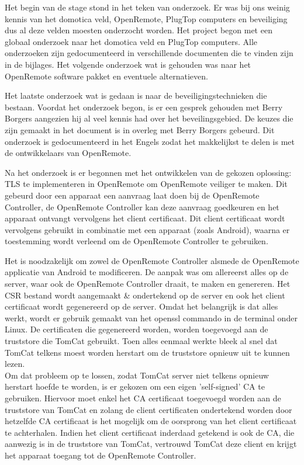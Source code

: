 \documentclass[]{article}
\begin{document}
Het begin van de stage stond in het teken van onderzoek. Er was bij ons
weinig kennis van het domotica veld, OpenRemote, PlugTop computers en
beveiliging dus al deze velden moesten onderzocht worden. Het project begon
met een globaal onderzoek naar het domotica veld en PlugTop computers. Alle
onderzoeken zijn gedocumenteerd in verschillende documenten die te vinden
zijn in de bijlages. Het volgende onderzoek wat is gehouden was naar het
OpenRemote software pakket en eventuele alternatieven.

Het laatste onderzoek wat is gedaan is naar de beveiligingstechnieken die
bestaan. Voordat het onderzoek begon, is er een gesprek gehouden met Berry
Borgers aangezien hij al veel kennis had over het beveilingsgebied. De
keuzes die zijn gemaakt in het document is in overleg met Berry Borgers
gebeurd. Dit onderzoek is gedocumenteerd in het Engels zodat het
makkelijkst te delen is met de ontwikkelaars van OpenRemote.

Na het onderzoek is er begonnen met het ontwikkelen van de gekozen
oplossing: TLS te implementeren in OpenRemote om OpenRemote veiliger te
maken. Dit gebeurd door een apparaat een aanvraag laat doen bij de
OpenRemote Controller, de OpenRemote Controller kan deze aanvraag
goedkeuren en het apparaat ontvangt vervolgens het client certificaat. Dit
client certificaat wordt vervolgens gebruikt in combinatie met een apparaat (zoals
Android), waarna er toestemming wordt verleend om de OpenRemote Controller te gebruiken.

Het is noodzakelijk om zowel de OpenRemote Controller alsmede de OpenRemote applicatie 
van Android te modificeren. De aanpak was om allereerst alles op de server, waar ook de 
OpenRemote Controller draait, te maken en genereren. Het CSR bestand wordt
aangemaakt \& ondertekend op de server en ook het
client certificaat wordt gegenereerd op de server. Omdat het belangrijk is
dat alles werkt, wordt er gebruik gemaakt van het openssl commando in de
terminal onder Linux. De certificaten die gegenereerd worden, worden
toegevoegd aan de truststore die TomCat gebruikt. Toen alles eenmaal
werkte bleek al snel dat TomCat telkens moest worden herstart om de
truststore opnieuw uit te kunnen lezen.\\
Om dat probleem op te lossen, zodat TomCat server niet telkens opnieuw
herstart hoefde te worden, is er gekozen om een eigen 'self-signed' CA te
gebruiken. Hiervoor moet enkel het CA certificaat toegevoegd worden aan de
truststore van TomCat en zolang de client certificaten ondertekend worden
door hetzelfde CA certificaat is het mogelijk om de oorsprong van het
client certificaat te achterhalen. Indien het client certificaat inderdaad
getekend is ook de CA, die aanwezig is in de truststore van TomCat, vertrouwd
TomCat deze client en krijgt het apparaat toegang tot de OpenRemote
Controller.
\end{document}

